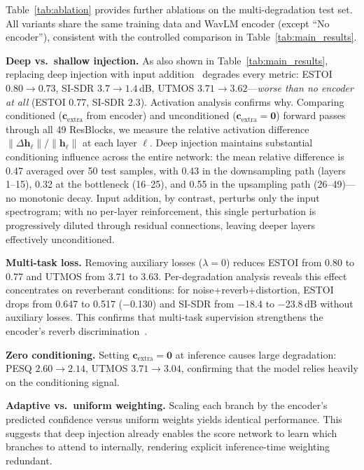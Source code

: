 \documentclass[cameraready]{Interspeech}
\begin{document}
Table~\ref{tab:ablation} provides further ablations on the multi-degradation test set.
All variants share the same training data and WavLM encoder (except ``No encoder''), consistent with the controlled comparison in Table~\ref{tab:main_results}.

\textbf{Deep vs.\ shallow injection.}
As also shown in Table~\ref{tab:main_results}, replacing deep injection with input addition~\cite{hu2023nase} degrades every metric: ESTOI $0.80 \to 0.73$, SI-SDR $3.7 \to 1.4$\,dB, UTMOS $3.71 \to 3.62$---\textit{worse than no encoder at all} (ESTOI 0.77, SI-SDR 2.3).
Activation analysis confirms why.
Comparing conditioned ($\mathbf{c}_\text{extra}$ from encoder) and unconditioned ($\mathbf{c}_\text{extra} = \mathbf{0}$) forward passes through all 49 ResBlocks, we measure the relative activation difference $\|\Delta\mathbf{h}_\ell\| / \|\mathbf{h}_\ell\|$ at each layer $\ell$.
Deep injection maintains substantial conditioning influence across the entire network: the mean relative difference is 0.47 averaged over 50 test samples, with 0.43 in the downsampling path (layers 1--15), 0.32 at the bottleneck (16--25), and 0.55 in the upsampling path (26--49)---no monotonic decay.
Input addition, by contrast, perturbs only the input spectrogram; with no per-layer reinforcement, this single perturbation is progressively diluted through residual connections, leaving deeper layers effectively unconditioned.

\textbf{Multi-task loss.}
Removing auxiliary losses ($\lambda = 0$) reduces ESTOI from 0.80 to 0.77 and UTMOS from 3.71 to 3.63.
Per-degradation analysis reveals this effect concentrates on reverberant conditions: for noise+reverb+distortion, ESTOI drops from 0.647 to 0.517 ($-$0.130) and SI-SDR from $-$18.4 to $-$23.8\,dB without auxiliary losses.
This confirms that multi-task supervision strengthens the encoder's reverb discrimination~\cite{caruana1997multitask}.

\textbf{Zero conditioning.}
Setting $\mathbf{c}_\text{extra} = \mathbf{0}$ at inference causes large degradation: PESQ $2.60 \to 2.14$, UTMOS $3.71 \to 3.04$, confirming that the model relies heavily on the conditioning signal.

\textbf{Adaptive vs.\ uniform weighting.}
Scaling each branch by the encoder's predicted confidence versus uniform weights yields identical performance.
This suggests that deep injection already enables the score network to learn which branches to attend to internally, rendering explicit inference-time weighting redundant.
\end{document}
